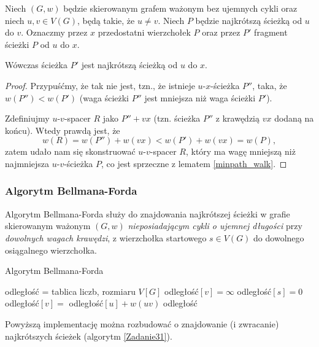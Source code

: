\begin{lemma}
	Niech $(G, w)$ będzie skierowanym grafem ważonym
	bez ujemnych cykli oraz niech $u, v \in V(G)$,
	będą takie, że $u \not = v$. Niech $P$ będzie
	najkrótszą ścieżką od $u$ do $v$. Oznaczmy przez
	$x$ przedostatni wierzchołek $P$ oraz 
	przez $P'$ fragment ścieżki $P$ od $u$ do $x$.
	
	Wówczas ścieżka $P'$ jest najkrótszą ścieżką od $u$ do 
	$x$.
	
	\begin{proof}
		Przypuśćmy, że tak nie jest, tzn., że istnieje 
		$u$-$x$-ścieżka $P''$, taka, że 
		$w(P'') < w(P')$ (waga ścieżki $P''$
		jest mniejsza niż waga ścieżki $P'$).
		
		Zdefiniujmy $u$-$v$-spacer $R$ jako $P'' + vx$
		(tzn. ścieżka $P''$ z krawędzią $vx$ 
		dodaną na końcu). Wtedy prawdą jest, że
		\[w(R) = w(P'') + w(vx) <
		w(P') + w(vx) = w(P),\]
		zatem udało nam się skonstruować 
		$u$-$v$-spacer $R$, który ma wagę mniejszą niż
		najmniejsza $u$-$v$-ścieżka $P$, co 
		jest sprzeczne z lematem \ref{minpath_walk}. \qedhere
	\end{proof}
	\label{minpath_subpath}
\end{lemma}
\subsubsection{Algorytm Bellmana-Forda}
Algorytm Bellmana-Forda służy do znajdowania 
najkrótszej ścieżki w grafie skierowanym ważonym $(G, w)$
\emph{nieposiadającym cykli o ujemnej długości} przy 
\emph{dowolnych wagach krawędzi},
z wierzchołka startowego $s \in V(G)$
do dowolnego osiągalnego wierzchołka.

\begin{algorithm}[H]
	\caption{Algorytm Bellmana-Forda}\label{bellmanford_alg}
	\begin{algorithmic}[1]
		\State odległość = tablica liczb, rozmiaru $V[G]$
		\State odległość$[v]=\infty$
		\EndFor
		\State odległość$[s]=0$
		\State odległość$[v]=$ odległość$[u] + w(uv)$ 
		\EndIf
		\EndFor
		\EndFor
		\State \Return odległość
		\EndProcedure
	\end{algorithmic}
	\label{bellman_ford}
\end{algorithm}
Powyższą implementację można rozbudować o
znajdowanie (i zwracanie) najkrótszych ścieżek
(algorytm \ref{Zadanie31}).

